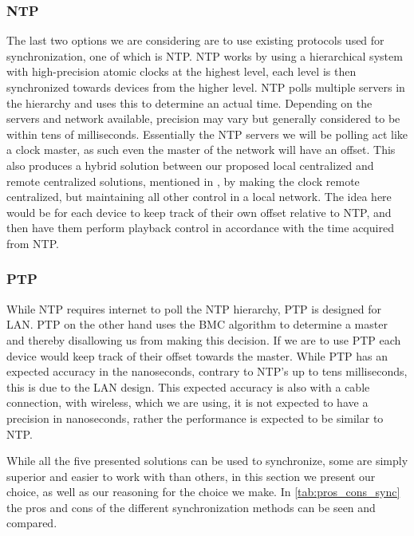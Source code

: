 \subsubsection{\acl{NTP}}
The last two options we are considering are to use existing protocols used for synchronization, one of which is \ac{NTP}.
\ac{NTP} works by using a hierarchical system with high-precision atomic clocks at the highest level, each level is then synchronized towards devices from the higher level.
\ac{NTP} polls multiple servers in the hierarchy and uses this to determine an actual time.
Depending on the servers and network available, precision may vary but generally considered to be within tens of milliseconds.
Essentially the \ac{NTP} servers we will be polling act like a clock master, as such even the master of the network will have an offset.
This also produces a hybrid solution between our proposed local centralized and remote centralized solutions, mentioned in , by making the clock remote centralized, but maintaining all other control in a local network.
The idea here would be for each device to keep track of their own offset relative to \ac{NTP}, and then have them perform playback control in accordance with the time acquired from \ac{NTP}.

\subsubsection{\acl{PTP}}
While \ac{NTP} requires internet to poll the \ac{NTP} hierarchy, \ac{PTP} is designed for LAN.
\ac{PTP} on the other hand uses the \ac{BMC} algorithm to determine a master and thereby disallowing us from making this decision.
If we are to use \ac{PTP} each device would keep track of their offset towards the master.
While \ac{PTP} has an expected accuracy in the nanoseconds, contrary to NTP's up to tens milliseconds, this is due to the LAN design.
This expected accuracy is also with a cable connection, with wireless, which we are using, it is not expected to have a precision in nanoseconds, rather the performance is expected to be similar to \ac{NTP}.


While all the five presented solutions can be used to synchronize, some are simply superior and easier to work with than others, in this section we present our choice, as well as our reasoning for the choice we make.
In \cref{tab:pros_cons_sync} the pros and cons of the different synchronization methods can be seen and compared.

